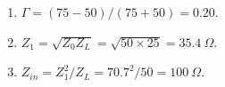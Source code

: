 \begin{enumerate}[leftmargin=1.6em,itemsep=2pt]
\item $\Gamma = (75-50)/(75+50) = 0.20$.
\item $Z_1 = \sqrt{Z_0 Z_L} = \sqrt{50\times25} = 35.4\ \Omega$.
\item $Z_{in} = Z_1^2/Z_L = 70.7^2/50 = 100\ \Omega$.
\end{enumerate}
